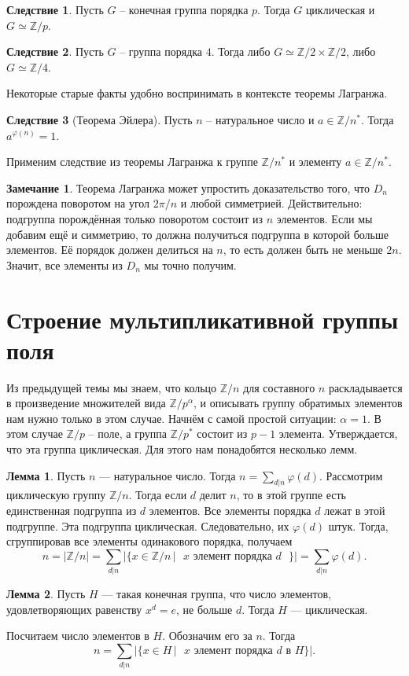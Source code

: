 \documentclass[10pt,a4paper,oneside]{book}
\theoremstyle{definition}
\newtheorem*{rem}{\color{green!50!blue}Замечание}
\newtheorem{lem}{\color{green!50!black}Лемма}
\newtheorem{cor}{\color{green!45!black}Следствие}
\newcommand{\mb}[1]{\mathbb{#1}}
\def\ffi{\varphi}
\def\lm{\begin{lem}}
\def\elm{\end{lem}}
\def\crl{\begin{cor}}
\def\ecrl{\end{cor}}
\def\rm{\begin{rem}}
\def\erm{\end{rem}}
\begin{document}
\crl Пусть $G$ -- конечная группа порядка $p$. Тогда $G$ циклическая и $G \simeq \mb Z/p$. 
\ecrl

\crl Пусть $G$ -- группа порядка $4$. Тогда либо $G \simeq \mb Z/2 \times \mb Z/2$, либо $G \simeq \mb Z/4$.
\ecrl



Некоторые старые факты удобно воспринимать в контексте теоремы Лагранжа.


\crl[Теорема Эйлера] Пусть $n$ -- натуральное число и $a\in \mb Z/n^*$. Тогда $a^{\ffi(n)}=1$.
\ecrl
\proof
Применим следствие из теоремы Лагранжа к группе $\mb Z/n^*$ и элементу $a\in \mb Z/n^*$.
\endproof

\rm Теорема Лагранжа может упростить доказательство того, что $D_n$ порождена поворотом на угол $2\pi/n$ и любой симметрией. Действительно: подгруппа порождённая только поворотом состоит из $n$ элементов. Если мы добавим ещё и симметрию, то должна получиться подгруппа в которой больше элементов. Её порядок должен делиться на $n$, то  есть должен быть не меньше $2n$. Значит, все элементы из $D_n$ мы точно получим.
\erm 




\section{Строение мультипликативной группы поля}


Из предыдущей темы мы знаем, что кольцо $\mb Z/n$ для составного $n$ раскладывается в произведение множителей вида $\mb Z/p^{\alpha}$, и описывать группу обратимых элементов нам нужно только в этом случае. Начнём с самой простой ситуации: $\alpha=1$. В этом случае $\mb Z/p$ -- поле, а группа $\mb Z/p^*$ состоит из $p-1$ элемента. Утверждается, что эта группа циклическая. Для этого нам понадобятся несколько лемм. 

\lm Пусть $n$ --- натуральное число. Тогда $n = \sum_{d|n}\varphi(d)$.
\proof  Рассмотрим циклическую группу $\mb Z/n$. Тогда если $d$ делит $n$, то в этой группе есть единственная подгруппа из $d$ элементов. Все элементы порядка $d$ лежат в этой подгруппе. Эта подгруппа циклическая. Следовательно, их $\ffi(d)$ штук. Тогда, сгруппировав все элементы одинакового порядка, получаем
$$n= |\mb Z/n |= \sum_{d|n} |\{ x \in \mb Z/n \,| \text{ $x$ элемент порядка $d$  }\}| = \sum_{d|n}\varphi(d).$$
\endproof
\elm

\lm Пусть $H$ --- такая конечная группа, что число элементов, удовлетворяющих равенству $x^d= e$, не больше $d$. Тогда $H$ --- циклическая.
\elm
\proof Посчитаем число элементов в $H$. Обозначим его за $n$. Тогда
$$ n = \sum_{d|n} |\{ x \in H \,|\text{  $x$ элемент порядка $d$ в $H$} \}|.$$
\end{document}

